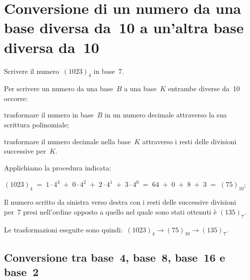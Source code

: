 \ovalbox{\risolvii{\ref{ese:4.6}, \ref{ese:4.7}, \ref{ese:4.8}, \ref{ese:4.9}, \ref{ese:4.10}, \ref{ese:4.11}, \ref{ese:4.12},
\ref{ese:4.13}, \ref{ese:4.14}}}

\section[Conversione da una base diversa da~10 a un'altra base diversa da~10]{Conversione di un numero da una base diversa da~10 a un'altra base diversa da~10}
\begin{exrig}
\begin{esempio}
Scrivere il numero~$(1023)_{4}$ in base~7.

Per scrivere un numero da una base~$B$ a una base~$K$ entrambe diverse da~10 occorre:

\begin{enumeratea}
\item trasformare il numero in base~$B$ in un numero decimale attraverso
la sua scrittura polinomiale;
\item trasformare il numero decimale nella base~$K$ attraverso i resti
delle divisioni successive per~$K$.
\end{enumeratea}

Applichiamo la procedura indicata:

\begin{enumeratea}
\item
$(1023)_{4}\;=\;1\cdot 4^{3}\;+\;0\cdot 4^{2}\;+\;2\cdot 4^{1}\;+\;3\cdot
4^{0}\;=\;64\;+\;0\;+\;8\;+\;3\;=\;(75)_{10}$;
\item Il numero scritto da sinistra verso destra con i resti delle successive
divisioni per~7 presi nell'ordine opposto a quello nel quale sono stati ottenuti è
$(135)_{7}$.
\end{enumeratea}

\begin{center}
 
\end{center}

Le trasformazioni eseguite
sono quindi:~$(1023)_{4}\rightarrow (75)_{10}\rightarrow (135)_{7}$.

\end{esempio}
\end{exrig}

\ovalbox{\risolvii \ref{ese:4.15}, \ref{ese:4.16}, \ref{ese:4.17}}

\subsection{Conversione tra base~4, base~8, base~16 e base~2}


